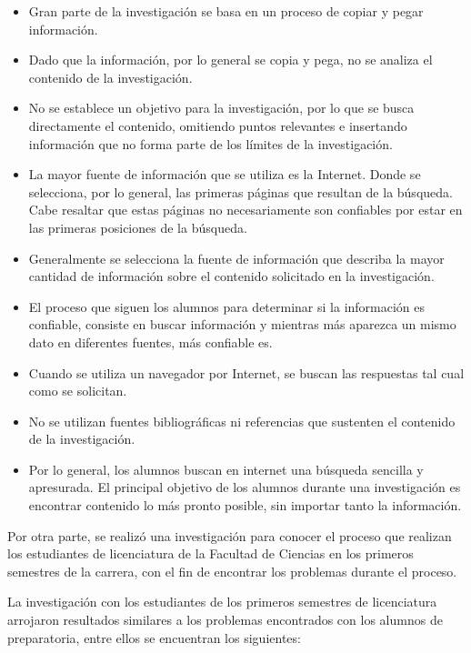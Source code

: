 \begin{itemize}
  \item Gran parte de la investigación se basa en un proceso de copiar y pegar información.
  \item Dado que la información, por lo general se copia y pega, no se analiza el contenido de la investigación.
  \item No se establece un objetivo para la investigación, por lo que se busca directamente el contenido, omitiendo puntos relevantes e insertando información que no forma parte de los límites de la investigación.
  \item La mayor fuente de información que se utiliza es la Internet. Donde se selecciona, por lo general, las primeras páginas que resultan de la búsqueda. Cabe resaltar que estas páginas no necesariamente son confiables por estar en las primeras posiciones de la búsqueda.
  \item Generalmente se selecciona la fuente de información que describa la mayor cantidad de información sobre el contenido solicitado en la investigación.
  \item El proceso que siguen los alumnos para determinar si la información es confiable, consiste en buscar información y mientras más aparezca un mismo dato en diferentes fuentes, más confiable es.
  \item Cuando se utiliza un navegador por Internet, se buscan las respuestas tal cual como se solicitan.
  \item No se utilizan fuentes bibliográficas ni referencias que sustenten el contenido de la investigación.
  \item Por lo general, los alumnos buscan en internet una búsqueda sencilla y apresurada. El principal objetivo de los alumnos durante una investigación es encontrar contenido lo más pronto posible, sin importar tanto la información.
\end{itemize}

Por otra parte, se realizó una investigación para conocer el proceso que realizan los estudiantes de licenciatura de la Facultad de Ciencias en los primeros semestres de la carrera, con el fin de encontrar los problemas durante el proceso.

La investigación con los estudiantes de los primeros semestres de licenciatura arrojaron resultados similares a los problemas encontrados con los alumnos de preparatoria, entre ellos se encuentran los siguientes:

